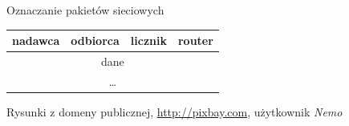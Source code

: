 \documentclass{mp}
\begin{document}
\begin{frame}{Oznaczanie pakietów sieciowych}
\begin{center}
\begin{tikzpicture}
\end{tikzpicture}
\end{center}
\begin{center}
\begin{tabular}{|p{2cm}|p{2cm}|p{1cm}|p{2cm}|}
\hline
nadawca & odbiorca & licznik & \textcolor{color2}{router} \\
\hline
\multicolumn{4}{|c|}{dane} \\
\multicolumn{4}{|c|}{\ldots} \\
\hline
\end{tabular}
\end{center}
\vfill
\tiny{Rysunki z domeny publicznej, \url{http://pixbay.com}, użytkownik \emph{Nemo}}
\end{frame}

\end{document}

